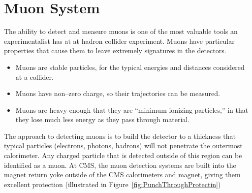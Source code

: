 \section{Muon System}
The ability to detect and measure muons is one of the most valuable tools an
experimentalist has at at hadron collider experiment.  Muons have particular
properties that cause them to leave extremely signatures in the detectors.
\begin{itemize}
  \item Muons are stable particles, for the typical energies and distances
    considered at a collider.
  \item Muons have non--zero charge, so their trajectories can be measured.
  \item Muons are heavy enough that they are ``minimum ionizing particles,'' in
    that they lose much less energy as they pass through material.
\end{itemize}
The approach to detecting muons is to build the detector to a thickness that
typical particles (electrons, photons, hadrons) will not penetrate the outermost
calorimeter.  Any charged particle that is detected outside of this region can
be identified as a muon.  At CMS, the muon detection systems are built into the
magnet return yoke outside of the CMS calorimeters and magnet, giving them
excellent protection (illustrated in Figure~\ref{fig:PunchThroughProtectin}) 
